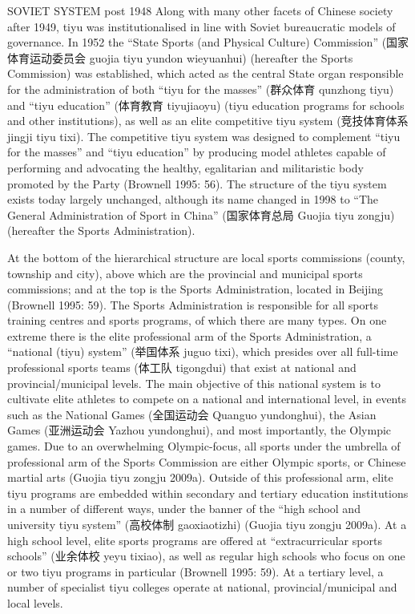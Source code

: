 SOVIET SYSTEM post 1948
Along with many other facets of Chinese society after 1949, tiyu was institutionalised in line with Soviet bureaucratic models of governance.  In 1952 the “State Sports (and Physical Culture) Commission” (国家体育运动委员会 guojia tiyu yundon wieyuanhui) (hereafter the Sports Commission) was established, which acted as the central State organ responsible for the administration of both “tiyu for the masses” (群众体育 qunzhong tiyu) and “tiyu education” (体育教育 tiyujiaoyu) (tiyu education programs for schools and other institutions), as well as an elite competitive tiyu system (竞技体育体系 jingji tiyu tixi).  The competitive tiyu system was designed to complement “tiyu for the masses” and “tiyu education” by producing model athletes capable of performing and advocating the healthy, egalitarian and militaristic body promoted by the Party (Brownell 1995: 56).   The structure of the tiyu system exists today largely unchanged, although its name changed in 1998 to “The General Administration of Sport in China” (国家体育总局 Guojia tiyu zongju) (hereafter the Sports Administration).

At the bottom of the hierarchical structure are local sports commissions (county, township and city), above which are the provincial and municipal sports commissions; and at the top is the Sports Administration, located in Beijing (Brownell 1995: 59).  The Sports Administration is responsible for all sports training centres and sports programs, of which there are many types.  On one extreme there is the elite professional arm of the Sports Administration, a “national (tiyu) system” (举国体系 juguo tixi), which presides over all full-time professional sports teams (体工队 tigongdui) that exist at national and provincial/municipal levels.  The main objective of this national system is to cultivate elite athletes to compete on a national and international level, in events such as the National Games (全国运动会 Quanguo yundonghui), the Asian Games (亚洲运动会 Yazhou yundonghui), and most importantly, the Olympic games.  Due to an overwhelming Olympic-focus, all sports under the umbrella of professional arm of the Sports Commission are either Olympic sports, or Chinese martial arts (Guojia tiyu zongju 2009a).  Outside of this professional arm, elite tiyu programs are embedded within secondary and tertiary education institutions in a number of different ways, under the banner of the “high school and university tiyu system” (高校体制 gaoxiaotizhi) (Guojia tiyu zongju 2009a).  At a high school level, elite sports programs are offered at “extracurricular sports schools” (业余体校 yeyu tixiao), as well as regular high schools who focus on one or two tiyu programs in particular (Brownell 1995: 59). At a tertiary level, a number of specialist tiyu colleges operate at national, provincial/municipal and local levels.

